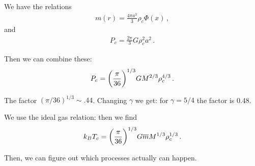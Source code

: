 \documentclass[main.tex]{subfiles}
\begin{document}
We have the relations 
%
\begin{align}
  m(r) = \frac{4 \pi a^3}{3} \rho _c \Phi (x)
\,,
\end{align}
%
and 
%
\begin{align}
  P_c = \frac{2 \pi }{3} G \rho_c^2 a^2
\,.
\end{align}

Then we can combine these: 
%
\begin{align}
  P_c = \qty(\frac{\pi }{36})^{1/3} G M^{2/3} \rho _c^{4/3}
\,.
\end{align}

The factor \((\pi / 36)^{1/3} \sim \num{.44}\). 
Changing \(\gamma \) we get: for \(\gamma = 5/4 \) the factor is \num{.48}.

We use the ideal gas relation: then we find 
%
\begin{align}
  k_B T_c = \qty(\frac{\pi }{36 })^{1/3} G \overline{m} M^{1/3} \rho _c^{1/3}
\,.
\end{align}

Then, we can figure out which processes actually can happen. 
\end{document}
